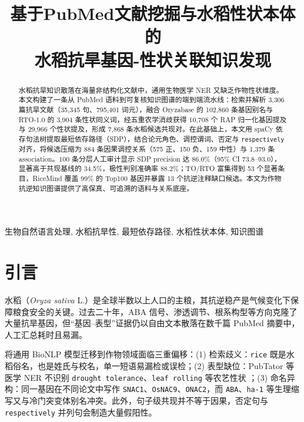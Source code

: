 \documentclass[conference]{IEEEtran}
\begin{document}
\title{基于PubMed文献挖掘与水稻性状本体的\\水稻抗旱基因-性状关联知识发现}

\author{
}

\maketitle

\begin{abstract}
水稻抗旱知识散落在海量非结构化文献中，通用生物医学 NER 又缺乏作物性状维度。本文构建了一条从 PubMed 语料到可复核知识图谱的端到端流水线：检索并解析 3,306 篇抗旱文献（35,345 句、795,401 词元），融合 Oryzabase 的 102,860 条基因别名与 RTO-1.0 的 3,904 条性状同义词，经五重农学消歧获得 10,708 个 RAP 归一化基因提及与 29,966 个性状提及，形成 7,868 条水稻候选共现对。在此基础上，本文用 spaCy 依存句法树提取最短依存路径（SDP），结合论元角色、调控谓词、否定与 \texttt{respectively} 对齐，将候选压缩为 884 条因果调控关系（575 正、150 负、159 中性）与 1,379 条 association。100 条分层人工审计显示 SDP precision 达 86.0\%（95\% CI 73.8--93.0），显著高于共现基线的 34.5\%，极性判别准确率 88.2\%；TO/RTO 富集得到 53 个显著条目，RiceMind 覆盖 99\% 的 Top100 基因并暴露 13 个抗逆注释缺口候选。本文为作物抗逆知识图谱提供了高保真、可追溯的语料与关系底座。
\end{abstract}

\begin{IEEEkeywords}
生物自然语言处理, 水稻抗旱性, 最短依存路径, 水稻性状本体, 知识图谱
\end{IEEEkeywords}

\section{引言}
水稻（\textit{Oryza sativa} L.）是全球半数以上人口的主粮，其抗逆稳产是气候变化下保障粮食安全的关键。过去二十年，ABA 信号、渗透调节、根系构型等方向克隆了大量抗旱基因，但“基因--表型”证据仍以自由文本散落在数千篇 PubMed 摘要中，人工汇总耗时且易漏。

将通用 BioNLP 模型迁移到作物领域面临三重偏移：(1) 检索歧义：\texttt{rice} 既是水稻俗名，也是姓氏与校名，单一短语易漏检或误检；(2) 表型缺位：PubTator 等医学 NER 不识别 \texttt{drought tolerance}、\texttt{leaf rolling} 等农艺性状 \cite{wei2024pubtator3}；(3) 命名异构：同一基因在不同论文中写作 \texttt{SNAC1}、\texttt{OsNAC9}、\texttt{ONAC2}，而 \texttt{ABA}、\texttt{ha-1} 等生理缩写又与冷门突变体别名冲突。此外，句子级共现并不等于因果，否定句与 \texttt{respectively} 并列句会制造大量假阳性。
\end{document}
